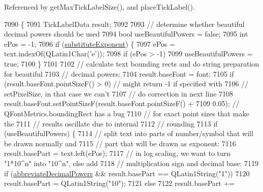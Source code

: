 Referenced by get\+Max\+Tick\+Label\+Size(), and place\+Tick\+Label().


\begin{DoxyCode}
7090                                                                    \{
7091   TickLabelData result;
7092 
7093   \textcolor{comment}{// determine whether beautiful decimal powers should be used}
7094   \textcolor{keywordtype}{bool} useBeautifulPowers = \textcolor{keyword}{false};
7095   \textcolor{keywordtype}{int} ePos = -1;
7096   \textcolor{keywordflow}{if} (\hyperlink{class_q_c_p_axis_painter_private_a546d22b10ddb5ca8582b7deb90223a91}{substituteExponent}) \{
7097     ePos = text.indexOf(QLatin1Char(\textcolor{charliteral}{'e'}));
7098     \textcolor{keywordflow}{if} (ePos > -1)
7099       useBeautifulPowers = \textcolor{keyword}{true};
7100   \}
7101 
7102   \textcolor{comment}{// calculate text bounding rects and do string preparation for beautiful}
7103   \textcolor{comment}{// decimal powers:}
7104   result.baseFont = font;
7105   \textcolor{keywordflow}{if} (result.baseFont.pointSizeF() > 0) \textcolor{comment}{// might return -1 if specified with}
7106                                         \textcolor{comment}{// setPixelSize, in that case we can't}
7107                                         \textcolor{comment}{// do correction in next line}
7108     result.baseFont.setPointSizeF(result.baseFont.pointSizeF() +
7109                                   0.05); \textcolor{comment}{// QFontMetrics.boundingRect has a bug}
7110                                          \textcolor{comment}{// for exact point sizes that make the}
7111                                          \textcolor{comment}{// results oscillate due to internal}
7112                                          \textcolor{comment}{// rounding}
7113   \textcolor{keywordflow}{if} (useBeautifulPowers) \{
7114     \textcolor{comment}{// split text into parts of number/symbol that will be drawn normally and}
7115     \textcolor{comment}{// part that will be drawn as exponent:}
7116     result.basePart = text.left(ePos);
7117     \textcolor{comment}{// in log scaling, we want to turn "1*10^n" into "10^n", else add}
7118     \textcolor{comment}{// multiplication sign and decimal base:}
7119     \textcolor{keywordflow}{if} (\hyperlink{class_q_c_p_axis_painter_private_a68353c2eeabd00d96a2e36a0b3809cb2}{abbreviateDecimalPowers} && result.basePart == QLatin1String(\textcolor{stringliteral}{"1"}))
7120       result.basePart = QLatin1String(\textcolor{stringliteral}{"10"});
7121     \textcolor{keywordflow}{else}
7122       result.basePart +=

\end{DoxyCode}
